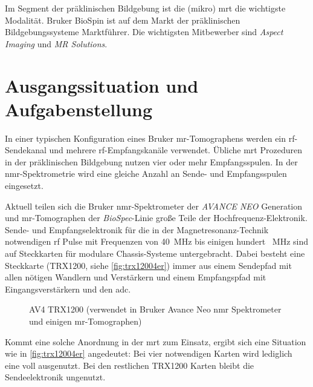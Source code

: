 Im Segment der präklinischen Bildgebung ist die (mikro) \gls{mrt} die wichtigste Modalität. Bruker BioSpin ist auf dem Markt der präklinischen Bildgebungssysteme Marktführer. Die wichtigsten Mitbewerber sind \textit{Aspect Imaging} und \textit{MR Solutions}.
 
\section{Ausgangssituation und Aufgabenstellung}
In einer typischen Konfiguration eines Bruker \gls{mr}-Tomographens werden ein \gls{rf}-Sendekanal und mehrere \gls{rf}-Empfangskanäle verwendet. Übliche \gls{mrt} Prozeduren in der präklinischen Bildgebung nutzen vier oder mehr Empfangsspulen. In der \gls{nmr}-Spektrometrie wird eine gleiche Anzahl an Sende- und Empfangsspulen eingesetzt.

Aktuell teilen sich die Bruker \gls{nmr}-Spektrometer der \textit{AVANCE NEO} Generation und \gls{mr}-Tomographen der \textit{BioSpec}-Linie große Teile der Hochfrequenz-Elektronik. Sende- und Empfangselektronik für die in der Magnetresonanz-Technik notwendigen \gls{rf} Pulse mit Frequenzen von \SI{40}{\mega\hertz} bis einigen hundert \SI{}{\mega\hertz} sind auf Steckkarten für modulare Chassis-Systeme untergebracht. Dabei besteht eine Steckkarte (TRX1200, siehe \autoref{fig:trx12004er}) immer aus einem Sendepfad mit allen nötigen Wandlern und Verstärkern und einem Empfangspfad mit Eingangsverstärkern und den \gls{adc}.

\begin{figure}[H]
	\centering
	\caption[Bruker Avance Neo TRX1200 Karte]{AV4 TRX1200 (verwendet in Bruker Avance Neo \gls{nmr} Spektrometer und einigen \gls{mr}-Tomographen)}
	\label{fig:trx12004er}
\end{figure}

Kommt eine solche Anordnung in der \gls{mrt} zum Einsatz, ergibt sich eine Situation wie in \autoref{fig:trx12004er} angedeutet: Bei vier notwendigen Karten wird lediglich eine voll ausgenutzt. Bei den restlichen TRX1200 Karten bleibt die Sendeelektronik ungenutzt.

